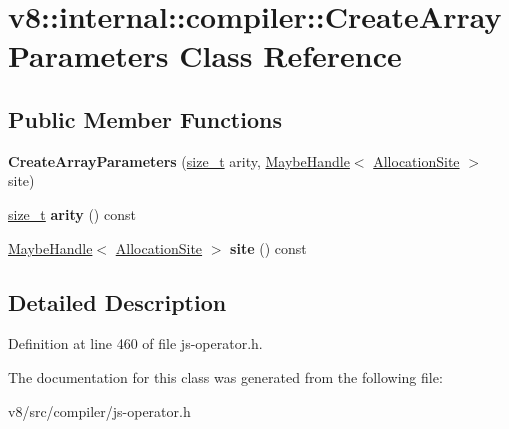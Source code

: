 \hypertarget{classv8_1_1internal_1_1compiler_1_1CreateArrayParameters}{}\section{v8\+:\+:internal\+:\+:compiler\+:\+:Create\+Array\+Parameters Class Reference}
\label{classv8_1_1internal_1_1compiler_1_1CreateArrayParameters}
\subsection*{Public Member Functions}
\begin{DoxyCompactItemize}
\item 
\mbox{\label{classv8_1_1internal_1_1compiler_1_1CreateArrayParameters_a99c751279fcdfd796aecd5ed5a9e86ef}} 
{\bfseries Create\+Array\+Parameters} (\mbox{\hyperlink{classsize__t}{size\+\_\+t}} arity, \mbox{\hyperlink{classv8_1_1internal_1_1MaybeHandle}{Maybe\+Handle}}$<$ \mbox{\hyperlink{classv8_1_1internal_1_1AllocationSite}{Allocation\+Site}} $>$ site)
\item 
\mbox{\label{classv8_1_1internal_1_1compiler_1_1CreateArrayParameters_a3cf02b9b1f3a01f2c0b044cc03c686d3}} 
\mbox{\hyperlink{classsize__t}{size\+\_\+t}} {\bfseries arity} () const
\item 
\mbox{\label{classv8_1_1internal_1_1compiler_1_1CreateArrayParameters_a52899f1e7e8ceab061818a905c552771}} 
\mbox{\hyperlink{classv8_1_1internal_1_1MaybeHandle}{Maybe\+Handle}}$<$ \mbox{\hyperlink{classv8_1_1internal_1_1AllocationSite}{Allocation\+Site}} $>$ {\bfseries site} () const
\end{DoxyCompactItemize}


\subsection{Detailed Description}


Definition at line 460 of file js-\/operator.\+h.



The documentation for this class was generated from the following file\+:\begin{DoxyCompactItemize}
\item 
v8/src/compiler/js-\/operator.\+h\end{DoxyCompactItemize}
